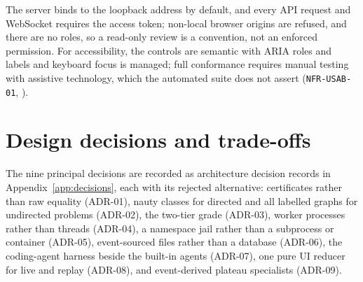 The server binds to the loopback address by default, and every API request and
WebSocket requires the access token; non-local browser origins are refused, and
there are no roles, so a read-only review is a convention, not an enforced
permission. For accessibility, the controls are semantic with ARIA roles and
labels and keyboard focus is managed; full conformance requires manual testing
with assistive technology, which the automated suite does not assert
(\texttt{NFR-USAB-01}, \citealp{wcag22}).


\section{Design decisions and trade-offs}
\label{sec:design-decisions}

The nine principal decisions are recorded as architecture decision records in
Appendix~\ref{app:decisions}, each with its rejected alternative: certificates
rather than raw equality (ADR-01), nauty classes for directed and all labelled
graphs for undirected problems (ADR-02), the two-tier grade (ADR-03), worker
processes rather than threads (ADR-04), a namespace jail rather than a subprocess
or container (ADR-05), event-sourced files rather than a database (ADR-06), the
coding-agent harness beside the built-in agents (ADR-07), one pure UI reducer for
live and replay (ADR-08), and event-derived plateau specialists (ADR-09).
